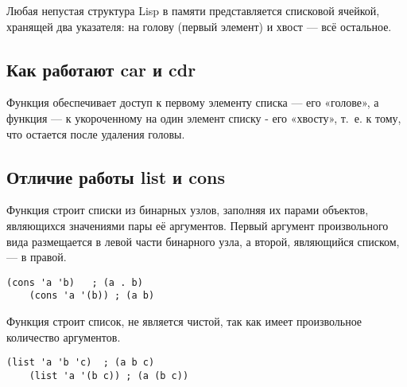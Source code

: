 \documentclass[a4paper,oneside,12pt]{extreport}
\begin{document}
Любая непустая структура Lisp в памяти представляется списковой ячейкой, хранящей два указателя: на голову (первый элемент) и хвост — всё остальное.

\subsection*{Как работают car и cdr}

Функция  обеспечивает доступ к первому элементу списка — его «голове», а функция  — к укороченному на один элемент списку - его «хвосту», т.~е. к тому, что остается после удаления головы.

\subsection*{Отличие работы list и cons}

Функция  строит списки из бинарных узлов, заполняя их парами объектов, являющихся значениями пары её аргументов.
Первый аргумент произвольного вида размещается в левой части бинарного узла, а второй, являющийся списком, — в правой.

\begin{lstlisting}[style=lispinline, gobble=8]
	(cons 'a 'b)   ; (a . b)
	(cons 'a '(b)) ; (a b)
\end{lstlisting}

Функция  строит список, не является чистой, так как имеет произвольное количество аргументов.
\begin{lstlisting}[style=lispinline, gobble=8]
	(list 'a 'b 'c)  ; (a b c)
	(list 'a '(b c)) ; (a (b c))
\end{lstlisting}
\end{document}
